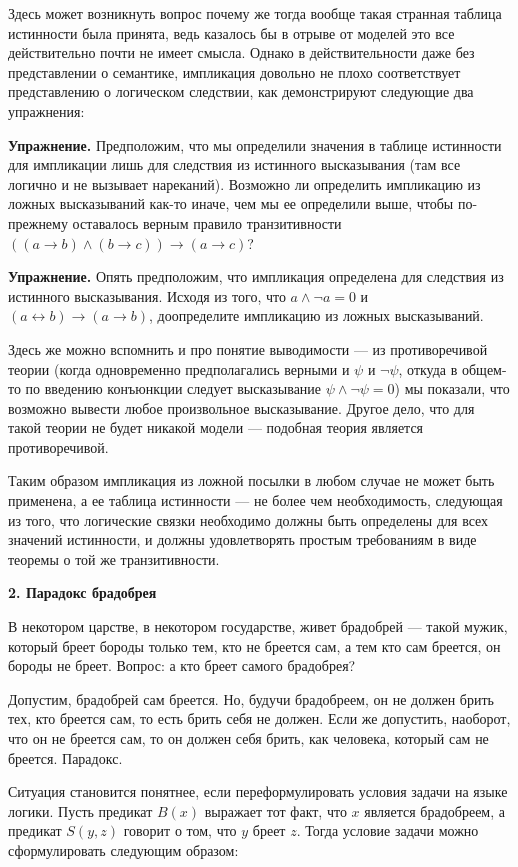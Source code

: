 Здесь может возникнуть вопрос почему же тогда вообще такая странная таблица истинности была принята, ведь казалось бы в отрыве от моделей это все действительно почти не имеет смысла. Однако в действительности даже без представлении о семантике, импликация довольно не плохо соответствует представлению о логическом следствии, как демонстрируют следующие два упражнения:

{\bfseries Упражнение.} Предположим, что мы определили значения в таблице истинности для импликации лишь для следствия из истинного высказывания (там все логично и не вызывает нареканий). Возможно ли определить импликацию из ложных высказываний как-то иначе, чем мы ее определили выше, чтобы по-прежнему оставалось верным правило транзитивности $((a\rightarrow b)\wedge(b\rightarrow c))\rightarrow (a\rightarrow c)$?

{\bfseries Упражнение.} Опять предположим, что импликация определена для следствия из истинного высказывания. Исходя из того, что $a\wedge\neg a = 0$ и $(a\leftrightarrow b)\rightarrow(a \rightarrow b)$, доопределите импликацию из ложных высказываний.

Здесь же можно вспомнить и про понятие выводимости — из противоречивой теории (когда одновременно предполагались верными и $\psi$ и $\neg\psi$, откуда в общем-то по введению конъюнкции следует высказывание $\psi\wedge\neg\psi=0$) мы показали, что возможно вывести любое произвольное высказывание. Другое дело, что для такой теории не будет никакой модели — подобная теория является противоречивой.

Таким образом импликация из ложной посылки в любом случае не может быть применена, а ее таблица истинности — не более чем необходимость, следующая из того, что логические связки необходимо должны быть определены для всех значений истинности, и должны удовлетворять простым требованиям в виде теоремы о той же транзитивности.

{\bfseries 2. Парадокс брадобрея}

В некотором царстве, в некотором государстве, живет брадобрей — такой мужик, который бреет бороды только тем, кто не бреется сам, а тем кто сам бреется, он бороды не бреет. Вопрос: а кто бреет самого брадобрея?

Допустим, брадобрей сам бреется. Но, будучи брадобреем, он не должен брить тех, кто бреется сам, то есть брить себя не должен. Если же допустить, наоборот, что он не бреется сам, то он должен себя брить, как человека, который сам не бреется. Парадокс.

Ситуация становится понятнее, если переформулировать условия задачи на языке логики. Пусть предикат $B(x)$ выражает тот факт, что $x$ является брадобреем, а предикат $S(y, z)$ говорит о том, что $y$ бреет $z$. Тогда условие задачи можно сформулировать следующим образом:

